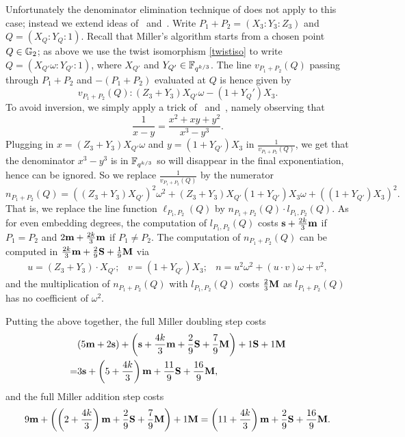 Unfortunately the denominator elimination technique of \cite{2010/Gu} does not apply to this case;
instead we extend ideas of~\cite{2008/lin} and~\cite{2009/deg15}.
Write $P_1 + P_2 = (X_3:Y_3:Z_3)$ and $Q = (X_Q:Y_Q:1)$. 
Recall that Miller's algorithm starts from a chosen point $Q \in \mathbb{G}_{2}$;
as above we use the twist isomorphism \eqref{twistiso} to write
$Q = (X_{Q'}\omega:Y_{Q'}:1)$, where $X_{Q'}$ and $Y_{Q'} \in \mathbb{F}_{q^{k/3}}$.
The line $v_{P_1+P_2}(Q)$ passing through $P_1+P_2$ and $-(P_1 + P_2)$ 
evaluated at $Q$
is hence given by
\[v_{P_1+P_2}(Q): 
(Z_3 + Y_3)X_{Q'}\omega - (1+Y_Q')X_3.\]
To avoid inversion, we simply apply a trick of~\cite{2008/lin} and~\cite{2009/deg15}, 
namely observing that
\[\frac{1}{x-y} = \frac{x^2 + xy + y^2}{x^3-y^3}.\]
Plugging in $x = (Z_3 + Y_3)X_{Q'}\omega$ and $y = (1+Y_{Q'})X_3$ in $\frac{1}{v_{P_1+P_2}(Q)}$,
we get that the denominator $x^3 - y^3$ is in $\mathbb{F}_{q^{k/3}}$ so will disappear in the final exponentiation, hence can be ignored.
So we replace $\frac{1}{v_{P_1+P_2}(Q)}$ by the numerator 
$$n_{P_1+P_2}(Q) = ((Z_3 + Y_3)X_{Q'})^2\omega^2 
+ (Z_3 + Y_3)X_{Q'}(1+Y_{Q'})X_3\omega 
+ ((1+Y_{Q'})X_3)^2.$$
That is, we replace the line function $\ell_{P_1,P_2}(Q)$ by $n_{P_1+P_2}(Q) \cdot l_{P_1,P_2}(Q)$.
As for even embedding degrees, the computation of $l_{P_1,P_2}(Q)$ costs $\textbf{s} + \frac{2k}{3}\textbf{m}$ if $P_1 = P_2$ and $2\textbf{m} + \frac{2k}{3}\textbf{m}$ if $P_1 \neq P_2$. 
The computation of $n_{P_1+P_2}(Q)$ can be computed in
$\frac{2k}{3}\textbf{m} + \frac{2}{9}\textbf{S} + \frac{1}{9}\textbf{M}$ via
\[\begin{array}{cccc}
u = (Z_3 + Y_3)\cdot X_{Q'}; &
v = (1+Y_{Q'})X_3; &
n = u^2\omega^2 + (u\cdot v)\omega + v^2,
\end{array}\]
and the multiplication of $n_{P_1+P_2}(Q)$ with $l_{P_1,P_2}(Q)$ costs $\frac{2}{3}\textbf{M}$ 
as $l_{P_1+P_2}(Q)$ has no coefficient of $\omega^2$.

Putting the above together, the full Miller doubling step costs
\begin{align*}
&(5\textbf{m} + 2\textbf{s}) + \left(\textbf{s} + \frac{4k}{3}\textbf{m} + \frac{2}{9}\textbf{S} + \frac{7}{9}\textbf{M}\right)  + 1\textbf{S} + 1\textbf{M} \\
=&3\textbf{s} + \left(5 + \frac{4k}{3}\right)\textbf{m} + \frac{11}{9}\textbf{S} + \frac{16}{9}\textbf{M},
\end{align*}
and the full Miller addition step costs 
\[9\textbf{m} + \left( \left(2+\frac{4k}{3}\right)\textbf{m} + \frac{2}{9}\textbf{S} + \frac{7}{9}\textbf{M}\right) + 1\textbf{M}
=\left( 11+\frac{4k}{3}\right)\textbf{m} + \frac{2}{9}\textbf{S} + \frac{16}{9}\textbf{M}.\]

